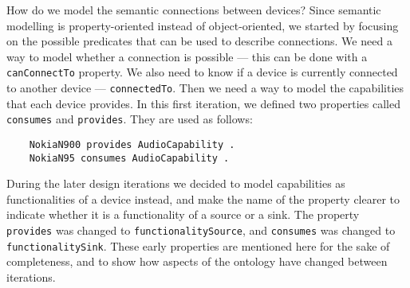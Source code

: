 
How do we model the semantic connections between devices? Since semantic modelling is property-oriented instead of object-oriented\cite{Segaran2009a}, we started by focusing on the possible predicates that can be used to describe connections. We need a way to model whether a connection is possible --- this can be done with a \texttt{canConnectTo} property. We also need to know if a device is currently connected to another device --- \texttt{connectedTo}. Then we need a way to model the capabilities that each device provides. In this first iteration, we defined two properties called \texttt{consumes} and \texttt{provides}. They are used as follows:

\begin{verbatim}
	NokiaN900 provides AudioCapability .
	NokiaN95 consumes AudioCapability .
\end{verbatim}

During the later design iterations we decided to model capabilities as functionalities of a device instead, and make the name of the property clearer to indicate whether it is a functionality of a source or a sink. The property \texttt{provides} was changed to \texttt{functionalitySource}, and \texttt{consumes} was changed to \texttt{functionalitySink}. These early properties are mentioned here for the sake of completeness, and to show how aspects of the ontology have changed between iterations.



